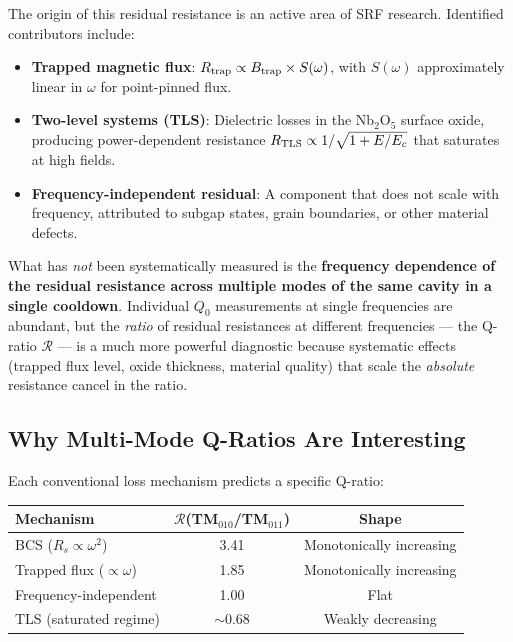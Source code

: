 \documentclass[11pt]{article}
\newcommand{\Rq}{\mathcal{R}}
\begin{document}
The origin of this residual resistance is an active area of SRF
research. Identified contributors include:
\begin{itemize}[nosep]
\item \textbf{Trapped magnetic flux}: $R_{\rm trap} \propto B_{\rm trap}
  \times S(\omega)$, with $S(\omega)$ approximately linear in $\omega$
  for point-pinned flux.
\item \textbf{Two-level systems (TLS)}: Dielectric losses in the
  Nb$_2$O$_5$ surface oxide, producing power-dependent resistance
  $R_{\rm TLS} \propto 1/\sqrt{1 + E/E_c}$ that saturates at high
  fields.
\item \textbf{Frequency-independent residual}: A component that does
  not scale with frequency, attributed to subgap states, grain boundaries,
  or other material defects.
\end{itemize}

What has \emph{not} been systematically measured is the
\textbf{frequency dependence of the residual resistance across multiple
modes of the same cavity in a single cooldown}. Individual $Q_0$
measurements at single frequencies are abundant, but the
\emph{ratio} of residual resistances at different frequencies ---
the Q-ratio $\Rq$ --- is a much more powerful diagnostic because
systematic effects (trapped flux level, oxide thickness, material
quality) that scale the \emph{absolute} resistance cancel in the ratio.

\subsection{Why Multi-Mode Q-Ratios Are Interesting}

Each conventional loss mechanism predicts a specific Q-ratio:
\begin{center}
\renewcommand{\arraystretch}{1.2}
\begin{tabular}{@{}lcc@{}}
\toprule
\textbf{Mechanism} & \textbf{$\Rq$(TM$_{010}$/TM$_{011}$)} & \textbf{Shape} \\
\midrule
BCS ($R_s \propto \omega^2$) & 3.41 & Monotonically increasing \\
Trapped flux ($\propto \omega$) & 1.85 & Monotonically increasing \\
Frequency-independent & 1.00 & Flat \\
TLS (saturated regime) & $\sim$0.68 & Weakly decreasing \\
\bottomrule
\end{tabular}
\end{center}
\end{document}
